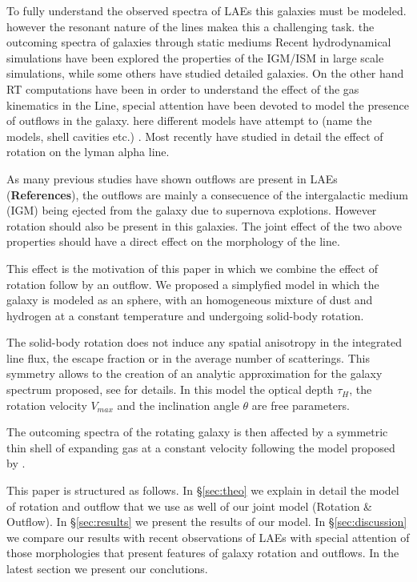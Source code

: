 \documentclass{latex/emulateapj}
\begin{document}
To fully understand the observed spectra of LAEs this galaxies must be modeled.
however the resonant nature of the lines makea this a challenging task. 
\cite{Neufeld90} the outcoming spectra of galaxies through static mediums 
Recent hydrodynamical simulations have been explored the properties of the IGM/ISM 
in large scale simulations, while some others have studied detailed galaxies. 
On the other hand RT computations have been in order to understand the effect of the 
gas kinematics in the Line, special attention have been devoted to model the presence 
of outflows in the galaxy. here different models have attempt to (name the models, shell cavities etc.)
. Most recently \cite{Garavito14} have studied in detail the effect 
of rotation on the lyman alpha line.

As many previous studies have shown outflows are present in LAEs (\textbf{References}),
the outflows are mainly a consecuence of the intergalactic medium (IGM) being ejected 
from the galaxy due to supernova explotions.
However rotation should also be present in this galaxies. The joint effect of the two 
above properties should have a direct effect on the morphology of the \lya line.

This effect is the motivation of this paper in which we combine the effect of rotation 
follow by an outflow. We proposed a simplyfied model in which the galaxy is modeled
as an sphere, with an homogeneous mixture of dust and hydrogen at a constant temperature
and undergoing solid-body rotation.  

The solid-body rotation does not induce any spatial anisotropy in the integrated line flux, 
the escape fraction or in the average number of scatterings. This symmetry allows 
to the creation of an analytic approximation for the galaxy spectrum 
proposed, see \cite{Garavito14} for details. In this model the optical depth $\tau_{H}$, the 
rotation velocity $V_{max}$ and the inclination angle $\theta$ are free parameters.
 
The outcoming spectra of the rotating galaxy is then affected by a symmetric thin shell of expanding
gas at a constant velocity following the model proposed by \cite{2014arXiv1404.2958V, Orsi12}.  

This paper is structured as follows. In \S \ref{sec:theo} we explain in detail the model of rotation
and outflow that we use as well of our joint model (Rotation \& Outflow). In \S \ref{sec:results} we present
the results of our model. In \S \ref{sec:discussion} we compare our results with 
recent observations of LAEs with special attention of those morphologies that present
features of galaxy rotation and outflows. In the latest section we present our 
conclutions.
\end{document}
